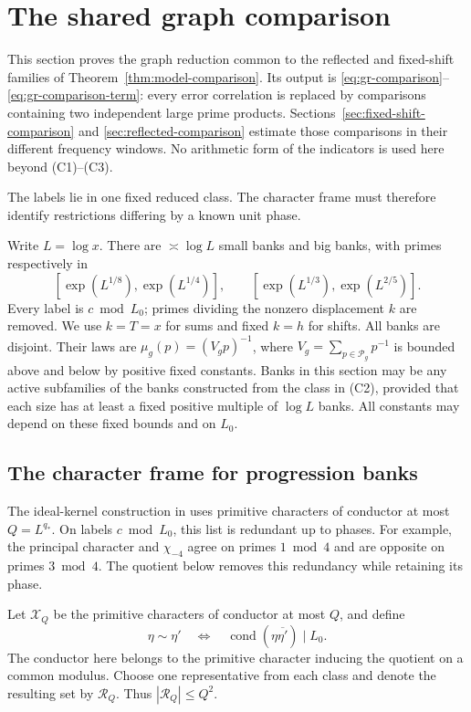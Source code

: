 \section{The shared graph comparison}\label{sec:graph}

This section proves the graph reduction common to the reflected and
fixed-shift families of Theorem~\ref{thm:model-comparison}. Its output is
\eqref{eq:gr-comparison}--\eqref{eq:gr-comparison-term}: every error
correlation is replaced by comparisons containing two independent
large prime products. Sections~\ref{sec:fixed-shift-comparison} and
\ref{sec:reflected-comparison} estimate those comparisons in their
different frequency windows. No arithmetic form of the indicators
is used here beyond \textup{(C1)--(C3)}.

The labels lie in one fixed reduced class. The character frame must
therefore identify restrictions differing by a known unit phase.

Write \(L=\log x\).  There are \(\asymp\log L\) small banks and big
banks, with primes respectively in
\[
 [\exp(L^{1/8}),\exp(L^{1/4})],\qquad
 [\exp(L^{1/3}),\exp(L^{2/5})].
\]
Every label is \(c\bmod L_0\); primes dividing the nonzero displacement
\(k\) are removed. We use \(k=T=x\) for sums and fixed \(k=h\)
for shifts. All banks are disjoint. Their laws are
\(\mu_g(p)=(V_gp)^{-1}\), where \(V_g=\sum_{p\in\mathcal P_g}p^{-1}\)
is bounded above and below by positive fixed constants.
Banks in this section may be any active subfamilies of the banks
constructed from the class in \textup{(C2)}, provided that each size has
at least a fixed positive multiple of \(\log L\) banks.
All constants may depend on these fixed bounds and on \(L_0\).

\subsection{The character frame for progression banks}

The ideal-kernel construction in \cite[Section~4]{weightedgraphs}
uses primitive characters of conductor at most \(Q=L^{q_*}\).
On labels \(c\bmod L_0\), this list is redundant up to phases.
For example, the principal character and \(\chi_{-4}\) agree on
primes \(1\bmod4\) and are opposite on primes \(3\bmod4\).
The quotient below removes this redundancy while retaining its phase.

Let \(\mathcal X_Q\) be the primitive characters of conductor at most
\(Q\), and define
\begin{equation}
 \eta\sim\eta'
 \quad\Longleftrightarrow\quad
 \operatorname{cond}(\eta\overline{\eta'})\mid L_0.
 \label{eq:gr-equivalence}
\end{equation}
The conductor here belongs to the primitive character inducing the
quotient on a common modulus.  Choose one representative from each
class and denote the resulting set by \(\mathcal R_Q\).
Thus \(|\mathcal R_Q|\le Q^2\).

